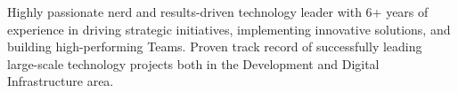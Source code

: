 
\begin{cvparagraph}

Highly passionate nerd and results-driven technology leader with 6+ years of experience in driving strategic initiatives, implementing innovative solutions, and building high-performing Teams.
Proven track record of successfully leading large-scale technology projects both in the Development and Digital Infrastructure area.
\end{cvparagraph}